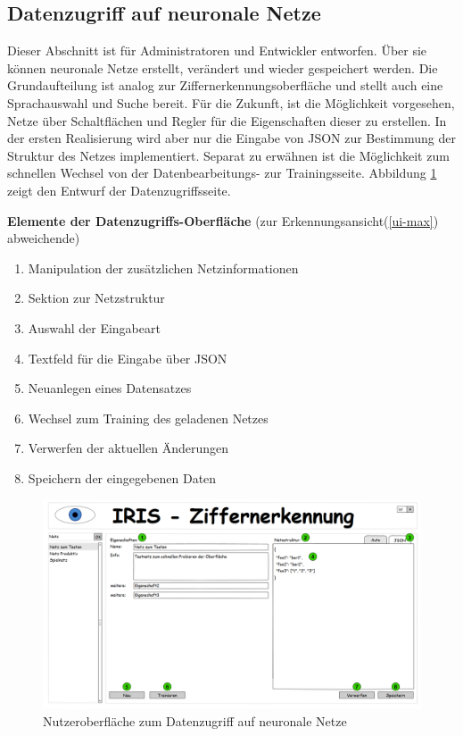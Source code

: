 \subsection{Datenzugriff auf neuronale Netze}
Dieser Abschnitt ist für Administratoren und Entwickler entworfen. Über sie können neuronale Netze erstellt, verändert und wieder gespeichert werden. Die Grundaufteilung ist analog zur Ziffernerkennungsoberfläche und stellt auch eine Sprachauswahl und Suche bereit. Für die Zukunft, ist die Möglichkeit vorgesehen, Netze über Schaltflächen und Regler für die Eigenschaften dieser zu erstellen. In der ersten Realisierung wird aber nur die Eingabe von JSON zur Bestimmung der Struktur des Netzes implementiert. Separat zu erwähnen ist die Möglichkeit zum schnellen Wechsel von der  Datenbearbeitungs- zur Trainingsseite. Abbildung \ref{ui-crud} zeigt den Entwurf der Datenzugriffsseite.

 \textbf{Elemente der Datenzugriffs-Oberfläche} (zur Erkennungsansicht(\ref{ui-max}) abweichende)
 \begin{enumerate}
 	\item Manipulation der zusätzlichen Netzinformationen
 	\item Sektion zur Netzstruktur
 	\item Auswahl der Eingabeart
 	\item Textfeld für die Eingabe über JSON
 	\item Neuanlegen eines Datensatzes
 	\item Wechsel zum Training des geladenen Netzes
 	\item Verwerfen der aktuellen Änderungen
 	\item Speichern der eingegebenen Daten
 \end{enumerate}

\begin{figure}[H]
	\centering
	\includegraphics[width=1\textwidth]{Abbildungen/UI-Mocks/CRUD-Ui.png}
	\caption{Nutzeroberfläche zum Datenzugriff auf neuronale Netze}
	\label{ui-crud}
\end{figure}

